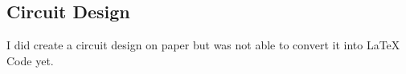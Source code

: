 \pagebreak

\subsection{Circuit Design}

I did create a circuit design on paper but was not able to convert it into LaTeX Code yet.

\iffalse
\begin{figure}[!ht]
    \centering
    \begin{circuitikz}
    \end{circuitikz}

    \label{circ:UART_Multiplexing}
\end{figure}
\fi

